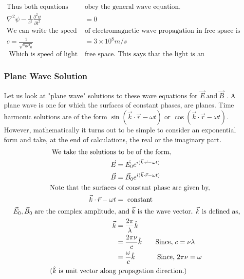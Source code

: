 \begin{center}
\end{center}
\begin{align*}
\text{Thus both equations }&\text{obey the general wave equation,}\\
\nabla^{2} \psi-\frac{1}{c^{2}} \frac{\partial^{2} \psi}{\partial t^{2}}&=0\\
\text{We can write the speed }&\text{of electromagnetic wave propagation in free space is}\\
c=\frac{1}{\sqrt{\varepsilon_0\mu_{0}}}&=3\times10^8 {m}/{s}\\
\text { Which is speed of light in  }&\text{free space. This says that the light is an electromagnetic wave.}
\end{align*}
\subsubsection{Plane Wave Solution}
Let us look at "plane wave" solutions to these wave equations for $\vec{E} \ \text{and}\ \vec{B}$ . A plane wave is one for which the surfaces of constant phases, are planes. Time harmonic solutions are of the form $\sin (\vec{k} \cdot \vec{r}-\omega t)$ or $\cos (\vec{k} \cdot \vec{r}-\omega t)$. However, mathematically it turns out to be simple to consider an exponential form and take, at the end of calculations, the real or the imaginary part.
\begin{align*}
\text{We take the solutions}&\text{ to be of the form,}\\
\vec{E}&=\vec{E}_{0} e^{i(\vec{k} \cdot \vec{r}-\omega t)} \\
\vec{B}&=\vec{B}_{0} e^{i(\vec{k} \cdot \vec{r}-\omega t)}\\
\text{Note that the surfaces}&\text{ of constant phase are given by,}\\
\vec{k} \cdot \vec{r}-\omega t&=\text { constant }\\
\text{$\vec{E}_{0}, \vec{B}_{0}$ are the complex amplitude,}&\text{ and $\vec{k}$ is the wave vector. $\vec{k}$ is defined as,}\\
\vec{k}&=\frac{2 \pi}{\lambda} \hat{k}\\&=\frac{2 \pi \nu }{c} \hat{k} \qquad \text{Since,}\ c=\nu \lambda\\
&=\frac{\omega}{c} \hat{k} \hspace{1.15cm}\text{Since,}\ 2 \pi \nu = \omega  \\
\text{($\hat{k}$ is unit vector along}&\text{ propagation direction.)}
\end{align*}

